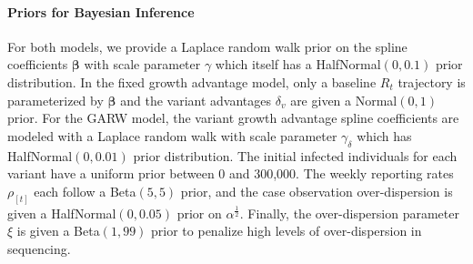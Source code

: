 \documentclass[11pt,oneside,letterpaper]{article}
\renewcommand{\vec}[1]{\boldsymbol{#1}}
\begin{document}


\paragraph{Priors for Bayesian Inference}%

For both models, we provide a Laplace random walk prior on the spline coefficients $\vec{\beta}$ with scale parameter $\gamma$ which itself has a HalfNormal$(0, 0.1)$ prior distribution.
In the fixed growth advantage model, only a baseline $R_{t}$ trajectory is parameterized by $\vec{\beta}$ and the variant advantages $\delta_{v}$ are given a Normal$(0,1)$ prior.
For the GARW model, the variant growth advantage spline coefficients are modeled with a Laplace random walk with scale parameter $\gamma_{\delta}$ which has HalfNormal$(0, 0.01)$ prior distribution.
The initial infected individuals for each variant have a uniform prior between 0 and 300,000.
The weekly reporting rates $\rho_{[t]}$ each follow a Beta$(5, 5)$ prior, and the case observation over-dispersion is given a HalfNormal$(0, 0.05)$ prior on $\alpha^{\frac{1}{2}}$.
Finally, the over-dispersion parameter $\xi$ is given a Beta$(1, 99)$ prior to penalize high levels of over-dispersion in sequencing.
\end{document}
